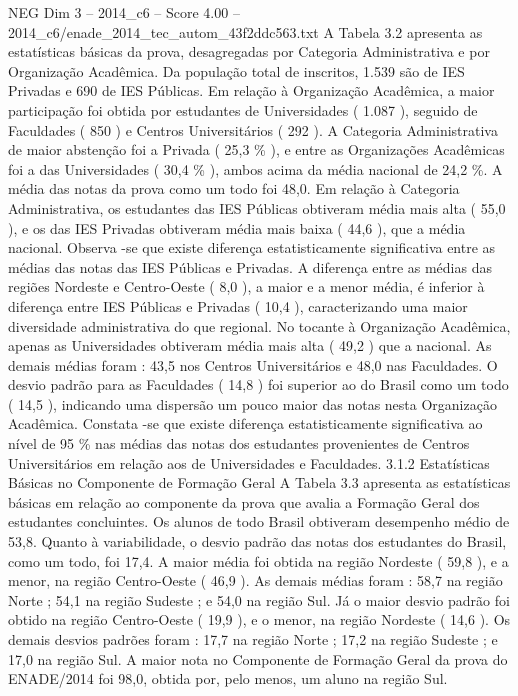 \begin{textsample}{NEG Dim 3 – 2014\_c6 – Score 4.00 – 2014\_c6/enade\_2014\_tec\_autom\_43f2ddc563.txt}
A Tabela 3.2 apresenta as estatísticas básicas da prova, desagregadas por Categoria Administrativa e por Organização Acadêmica.
Da população total de inscritos, 1.539 são de IES Privadas e 690 de IES Públicas.
Em relação à Organização Acadêmica, a maior participação foi obtida por estudantes de Universidades ( 1.087 ), seguido de Faculdades ( 850 ) e Centros Universitários ( 292 ).
A Categoria Administrativa de maior abstenção foi a Privada ( 25,3 \% ), e entre as Organizações Acadêmicas foi a das Universidades ( 30,4 \% ), ambos acima da média nacional de 24,2 \%.
A média das notas da prova como um todo foi 48,0.
Em relação à Categoria Administrativa, os estudantes das IES Públicas obtiveram média mais alta ( 55,0 ), e os das IES Privadas obtiveram média mais baixa ( 44,6 ), que a média nacional.
Observa -se que existe diferença estatisticamente significativa entre as médias das notas das IES Públicas e Privadas.
A diferença entre as médias das regiões Nordeste e Centro-Oeste ( 8,0 ), a maior e a menor média, é inferior à diferença entre IES Públicas e Privadas ( 10,4 ), caracterizando uma maior diversidade administrativa do que regional.
No tocante à Organização Acadêmica, apenas as Universidades obtiveram média mais alta ( 49,2 ) que a nacional.
As demais médias foram : 43,5 nos Centros Universitários e 48,0 nas Faculdades.
O desvio padrão para as Faculdades ( 14,8 ) foi superior ao do Brasil como um todo ( 14,5 ), indicando uma dispersão um pouco maior das notas nesta Organização Acadêmica.
Constata -se que existe diferença estatisticamente significativa ao nível de 95 \% nas médias das notas dos estudantes provenientes de Centros Universitários em relação aos de Universidades e Faculdades. 3.1.2 Estatísticas Básicas no Componente de Formação Geral A Tabela 3.3 apresenta as estatísticas básicas em relação ao componente da prova que avalia a Formação Geral dos estudantes concluintes.
Os alunos de todo Brasil obtiveram desempenho médio de 53,8.
Quanto à variabilidade, o desvio padrão das notas dos estudantes do Brasil, como um todo, foi 17,4.
A maior média foi obtida na região Nordeste ( 59,8 ), e a menor, na região Centro-Oeste ( 46,9 ).
As demais médias foram : 58,7 na região Norte ; 54,1 na região Sudeste ; e 54,0 na região Sul.
Já o maior desvio padrão foi obtido na região Centro-Oeste ( 19,9 ), e o menor, na região Nordeste ( 14,6 ).
Os demais desvios padrões foram : 17,7 na região Norte ; 17,2 na região Sudeste ; e 17,0 na região Sul.
A maior nota no Componente de Formação Geral da prova do ENADE/2014 foi 98,0, obtida por, pelo menos, um aluno na região Sul.

\end{textsample}
